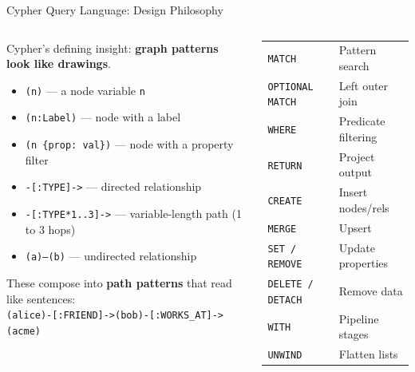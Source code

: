 \documentclass[aspectratio=169]{beamer}
\begin{document}
\begin{frame}{Cypher Query Language: Design Philosophy}
  \begin{columns}[T]
      \begin{tcolorbox}[neo4jbox, title=ASCII-Art Syntax]
        \scriptsize
        Cypher's defining insight: \textbf{graph patterns look like drawings}.
        \vspace{0.2cm}
        \begin{itemize}
          \item \texttt{(n)} — a node variable \texttt{n}
          \item \texttt{(n:Label)} — node with a label
          \item \texttt{(n \{prop: val\})} — node with a property filter
          \item \texttt{-[:TYPE]->} — directed relationship
          \item \texttt{-[:TYPE*1..3]->} — variable-length path (1 to 3 hops)
          \item \texttt{(a)--(b)} — undirected relationship
        \end{itemize}
        \vspace{0.2cm}
        These compose into \textbf{path patterns} that read like sentences:\\
        \texttt{(alice)-[:FRIEND]->(bob)-[:WORKS\_AT]->(acme)}
      \end{tcolorbox}
      \begin{tcolorbox}[infobox, title=Core Cypher Clauses]
        \scriptsize
        \begin{tabular}{@{}ll@{}}
          \texttt{MATCH} & Pattern search \\
          \texttt{OPTIONAL MATCH} & Left outer join \\
          \texttt{WHERE} & Predicate filtering \\
          \texttt{RETURN} & Project output \\
          \texttt{CREATE} & Insert nodes/rels \\
          \texttt{MERGE} & Upsert \\
          \texttt{SET / REMOVE} & Update properties \\
          \texttt{DELETE / DETACH} & Remove data \\
          \texttt{WITH} & Pipeline stages \\
          \texttt{UNWIND} & Flatten lists \\

\end{tabular}
\end{tcolorbox}
\end{columns}
\end{frame}
\end{document}
